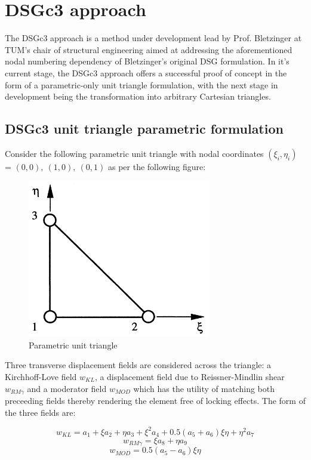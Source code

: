 \section{DSGc3 approach}
The DSGc3 approach is a method under development lead by Prof. Bletzinger at TUM's chair of structural engineering aimed at addressing the aforementioned nodal numbering dependency of Bletzinger's original DSG formulation. In it's current stage, the DSGc3 approach offers a successful proof of concept in the form of a parametric-only unit triangle formulation, with the next stage in development being the transformation into arbitrary Cartesian triangles. 

\subsection{DSGc3 unit triangle parametric formulation}
Consider the following parametric unit triangle with nodal coordinates $(\xi_i,\eta_i)$ = $(0,0),\ (1,0),\ (0,1)$ as per the following figure:

\begin{figure}[H]
	\centering
	\includegraphics[width=8cm]{images/parametric_unit_triangle.png}
	\caption{Parametric unit triangle \cite{Ble00}}
	\label{fig:parametric_unit_triangle}
\end{figure}

Three transverse displacement fields are considered across the triangle: a Kirchhoff-Love field $w_{KL}$, a displacement field due to Reissner-Mindlin shear $w_{RM \gamma}$ and a moderator field $w_{MOD}$ which has the utility of matching both preceeding fields thereby rendering the element free of locking effects. The form of the three fields are:

\begin{equation} 
w_{KL} = a_1 + \xi a_2 + \eta a_3 + \xi^2 a_4 + 0.5(a_5 + a_6)\xi \eta + \eta^2 a_7
\label{eqDSGc3_1}
\end{equation}
\begin{equation} 
w_{RM \gamma} = \xi a_8 + \eta a_9
\label{eqDSGc3_2}
\end{equation}
\begin{equation} 
w_{MOD} = 0.5(a_5 - a_6)\xi \eta
\label{eqDSGc3_3}
\end{equation}

